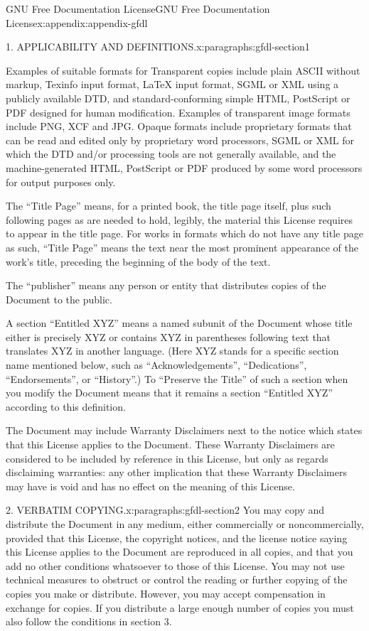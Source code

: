 \documentclass[twoside,10pt,]{book}
\numberwithin{equation}{part}
\begin{document}
\begin{appendixptx}{GNU Free Documentation License}{}{GNU Free Documentation License}{}{}{x:appendix:appendix-gfdl}
\begin{paragraphs}{1. APPLICABILITY AND DEFINITIONS.}{x:paragraphs:gfdl-section1}
\par
Examples of suitable formats for Transparent copies include plain ASCII without markup, Texinfo input format, LaTeX input format, SGML or XML using a publicly available DTD, and standard-conforming simple HTML, PostScript or PDF designed for human modification. Examples of transparent image formats include PNG, XCF and JPG. Opaque formats include proprietary formats that can be read and edited only by proprietary word processors, SGML or XML for which the DTD and\slash{}or processing tools are not generally available, and the machine-generated HTML, PostScript or PDF produced by some word processors for output purposes only.%
\par
The ``Title Page'' means, for a printed book, the title page itself, plus such following pages as are needed to hold, legibly, the material this License requires to appear in the title page. For works in formats which do not have any title page as such, ``Title Page'' means the text near the most prominent appearance of the work's title, preceding the beginning of the body of the text.%
\par
The ``publisher'' means any person or entity that distributes copies of the Document to the public.%
\par
A section ``Entitled XYZ'' means a named subunit of the Document whose title either is precisely XYZ or contains XYZ in parentheses following text that translates XYZ in another language. (Here XYZ stands for a specific section name mentioned below, such as ``Acknowledgements'', ``Dedications'', ``Endorsements'', or ``History''.) To ``Preserve the Title'' of such a section when you modify the Document means that it remains a section ``Entitled XYZ'' according to this definition.%
\par
The Document may include Warranty Disclaimers next to the notice which states that this License applies to the Document. These Warranty Disclaimers are considered to be included by reference in this License, but only as regards disclaiming warranties: any other implication that these Warranty Disclaimers may have is void and has no effect on the meaning of this License.%
\end{paragraphs}%
\begin{paragraphs}{2. VERBATIM COPYING.}{x:paragraphs:gfdl-section2}%
You may copy and distribute the Document in any medium, either commercially or noncommercially, provided that this License, the copyright notices, and the license notice saying this License applies to the Document are reproduced in all copies, and that you add no other conditions whatsoever to those of this License. You may not use technical measures to obstruct or control the reading or further copying of the copies you make or distribute. However, you may accept compensation in exchange for copies. If you distribute a large enough number of copies you must also follow the conditions in section 3.%

\end{paragraphs}
\end{appendixptx}
\end{document}
